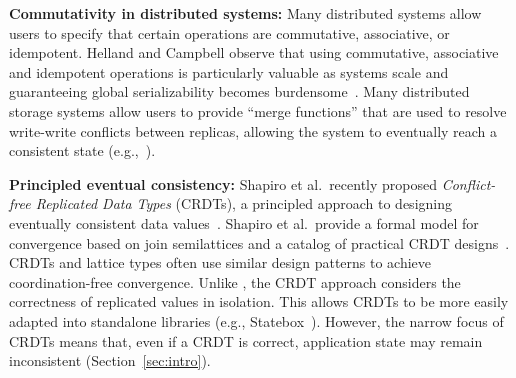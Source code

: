 \vspace{0.5em}\noindent
\textbf{Commutativity in distributed systems:} Many distributed systems allow
users to specify that certain operations are commutative, associative, or
idempotent. Helland and Campbell observe that using commutative, associative and
idempotent operations is particularly valuable as systems scale and guaranteeing
global serializability becomes burdensome~\cite{Helland2009}. Many
distributed storage systems allow users to provide ``merge functions'' that are
used to resolve write-write conflicts between replicas, allowing the system to
eventually reach a consistent state
(e.g.,~\cite{DeCandia2007,statebox,Lloyd2011,Reiher1994,Terry1995}).%



\vspace{0.5em}\noindent
\textbf{Principled eventual consistency:} Shapiro et al.\ recently proposed
\emph{Conflict-free Replicated Data Types} (CRDTs), a principled approach to
designing eventually consistent data values~\cite{Shapiro2011b}. Shapiro et al.\
provide a formal model for convergence based on join semilattices and a catalog
of practical CRDT designs~\cite{Shapiro2011a}. CRDTs and \lang lattice types
often use similar design patterns to achieve coordination-free
convergence. Unlike \lang, the CRDT approach considers the correctness of
replicated values in isolation. This allows CRDTs to be more easily adapted into
standalone libraries (e.g., Statebox~\cite{statebox}). However, the narrow focus
of CRDTs means that, even if a CRDT is correct, application state may remain
inconsistent (Section~\ref{sec:intro}).

